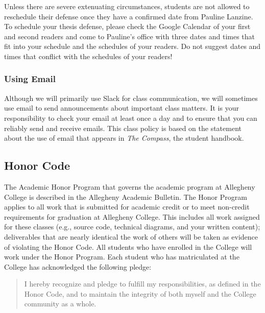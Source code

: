 \begin{itemize}
    Unless there are severe extenuating circumstances, students are not allowed to reschedule their defense once they
    have a confirmed date from Pauline Lanzine. To schedule your thesis defense, please check the Google Calendar of
    your first and second readers and come to Pauline's office with three dates and times that fit into your schedule
    and the schedules of your readers. Do not suggest dates and times that conflict with the schedules of your readers!

\end{itemize}


\vspace*{-.15in}
\subsubsection*{Using Email}
\vspace*{-.05in}

Although we will primarily use Slack for class communication, we will sometimes use email to send announcements about
important class matters. It is your responsibility to check your email at least once a day and to ensure that you can
reliably send and receive emails. This class policy is based on the statement about the use of email that appears in
{\em The Compass}, the student handbook.

\vspace*{-.15in}
\subsection*{Honor Code}
\vspace*{-.05in}

The Academic Honor Program that governs the academic program at Allegheny College is described in the Allegheny
Academic Bulletin.  The Honor Program applies to all work that is submitted for academic credit or to meet non-credit
requirements for graduation at Allegheny College.  This includes all work assigned for these classes (e.g., source code,
technical diagrams, and your written content); deliverables that are nearly identical the work of others will be taken
as evidence of violating the Honor Code. All students who have enrolled in the College will work under the Honor
Program.  Each student who has matriculated at the College has acknowledged the following pledge:

\vspace*{-.1in}
\begin{quote}
I hereby recognize and pledge to fulfill my responsibilities, as defined in the Honor Code, and to maintain the
integrity of both myself and the College community as a whole.
\end{quote}
\vspace*{-.3in}

